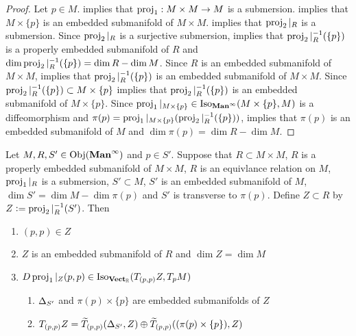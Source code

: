 \documentclass{book}
\begin{document}
	\begin{proof}
		Let $p \in M$.  implies that $\operatorname{\text{proj}}_1: M \times M \rightarrow M$ is a submersion. \rex{} implies that $M \times \{p\}$ is an embedded submanifold of $M \times M$.  implies that $\operatorname{\text{proj}}_2|_R$ is a submersion. Since $\operatorname{\text{proj}}_2|_R$ is a surjective submersion,  implies that $\operatorname{\text{proj}}_2|_R^{-1}(\{p\})$ is a properly embedded submanifold of $R$ and $\dim \operatorname{\text{proj}}_2|_R^{-1}(\{p\}) = \dim R - \dim M$. Since $R$ is an embedded submanifold of $M \times M$,   implies that $\operatorname{\text{proj}}_2|_R^{-1}(\{p\})$ is an embedded submanifold of $M \times M$. Since $\operatorname{\text{proj}}_2|_R^{-1}(\{p\}) \subset M \times \{p\}$  implies that $\operatorname{\text{proj}}_2|_R^{-1}(\{p\})$ is an embedded submanifold of $M \times \{p\}$. Since $\operatorname{\text{proj}}_1|_{M \times \{p\}} \in \operatorname{Iso}_{\operatorname*{\text{\textbf{Man}}^{\infty}}}(M \times \{p\}, M)$ is a diffeomorphism and $\pi(p) = \operatorname{\text{proj}}_1|_{M \times \{p\}}(\operatorname{\text{proj}}_2|_R^{-1}(\{p\}))$,   implies that $\pi(p)$ is an embedded submanifold of $M$ and $\dim \pi(p) = \dim R - \dim M$.
	\end{proof}

	\begin{ex} 
		Let $M, R, S' \in \operatorname{Obj}(\operatorname*{\text{\textbf{Man}}^{\infty}})$ and $p \in S'$. Suppose that $R \subset M \times M$, $R$ is a properly embedded submanifold of $M \times M$, $R$ is an equivlance relation on $M$, $\operatorname{\text{proj}}_1|_R$ is a submersion, $S' \subset M$, $S'$ is an embedded submanifold of $M$, $\dim S' = \dim M - \dim \pi(p)$ and $S'$ is transverse to $\pi(p)$. Define $Z \subset R$ by $Z \vcentcolon= \operatorname{\text{proj}}_2|_R^{-1}(S')$. Then 
		\begin{enumerate}
			\item $(p,p) \in Z$
			\item $Z$ is an embedded submanifold of $R$ and $\dim Z = \dim M$
			\item $D\operatorname{\text{proj}}_1|_Z(p,p) \in \operatorname{Iso}_{\operatorname*{\text{\textbf{Vect}}_{\mathbb{R}}}}(T_{(p,p)}Z, T_pM)$ \\
			\begin{enumerate}
				\item $\Delta_{S'}$ and $\pi(p) \times \{p\}$ are embedded submanifolds of $Z$
				\item $T_{(p,p)} Z = \widetilde{T}_{(p,p)} (\Delta_{S'}, Z) \oplus \widetilde{T}_{(p,p)} ((\pi(p) \times \{p\}), Z)$
			\end{enumerate}
		\end{enumerate}
	\end{ex}
\end{document}
